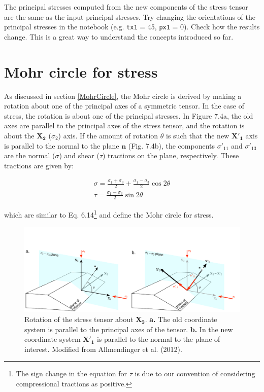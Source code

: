 \documentclass[a4paper , 12pt]{book}
\newcommand{\code}[1]{\colorbox{light-gray}{\texttt{#1}}}
\begin{document}
The principal stresses computed from the new components of the stress tensor are the same as the input principal stresses. Try changing the orientations of the principal stresses in the notebook (e.g. \code{tx1} = 45, \code{px1} = 0). Check how the results change. This is a great way to understand the concepts introduced so far.

\section{Mohr circle for stress}

As discussed in section \ref{MohrCircle}, the Mohr circle is derived by making a rotation about one of the principal axes of a symmetric tensor. In the case of stress, the rotation is about one of the principal stresses. In Figure 7.4a, the old axes are parallel to the principal axes of the stress tensor, and the rotation is about the $\mathbf{X_2}$ ($\sigma_2$) axis. If the amount of rotation $\theta$ is such that the new $\mathbf{X'_1}$ axis is parallel to the normal to the plane $\mathbf{n}$ (Fig. 7.4b), the components $\sigma '_{11}$ and $\sigma '_{13}$ are the normal ($\sigma$) and shear ($\tau$) tractions on the plane, respectively. These tractions are given by:

\begin{equation}
    \begin{gathered}
        \sigma=\frac{\sigma_1+\sigma_3}{2}+\frac{\sigma_1-\sigma_3}{2}\cos2\theta \\
        \tau=\frac{\sigma_1-\sigma_3}{2}\sin2\theta
    \end{gathered}
\end{equation}

which are similar to Eq. 6.14\footnote{The sign change in the equation for $\tau$ is due to our convention of considering compressional tractions as positive.} and define the Mohr circle for stress. 

\begin{figure}[ht]
    \centering
    \includegraphics[width=15cm]{ch7f4.pdf}
    \caption{Rotation of the stress tensor about $\mathbf{X_2}$. \textbf{a.} The old coordinate system is parallel to the principal axes of the tensor. \textbf{b.} In the new coordinate system $\mathbf{X'_1}$ is parallel to the normal to the plane of interest. Modified from Allmendinger et al. (2012).} 
\end{figure}
\end{document}

